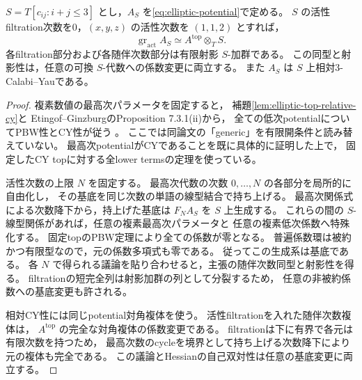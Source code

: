 \begin{lemma}\label{lem:elliptic-universal-lower-pbw}
$S=T[c_{ij}:i+j\le3]$ とし，$A_S$ を\eqref{eq:elliptic-potential}で定める。
$S$ の活性filtration次数を0，$(x,y,z)$ の活性次数を $(1,1,2)$ とすれば，
\[
 \operatorname{gr}_{\mathrm{act}}A_S
       \simeq A^{\mathrm{top}}\otimes_T S.
\]
各filtration部分および各随伴次数部分は有限射影 $S$-加群である。
この同型と射影性は，任意の可換 $S$-代数への係数変更に両立する。
また $A_S$ は $S$ 上相対3-Calabi--Yauである。
\end{lemma}
\begin{proof}
複素数値の最高次パラメータを固定すると，
補題\ref{lem:elliptic-top-relative-cy}と
Etingof--GinzburgのProposition 7.3.1(ii)から，
全ての低次potentialについてPBW性とCY性が従う
\cite{EG2010}。
ここでは同論文の「generic」を有限開条件と読み替えていない。
最高次potentialがCYであることを既に具体的に証明した上で，
固定したCY topに対する全lower termsの定理を使っている。

活性次数の上限 $N$ を固定する。
最高次代数の次数 $0,\ldots,N$ の各部分を局所的に自由化し，
その基底を同じ次数の単語の線型結合で持ち上げる。
最高次関係式による次数降下から，持上げた基底は
$F_NA_S$ を $S$ 上生成する。
これらの間の $S$-線型関係があれば，任意の複素最高次パラメータと
任意の複素低次係数へ特殊化する。
固定topのPBW定理により全ての係数が零となる。
普遍係数環は被約かつ有限型なので，元の係数多項式も零である。
従ってこの生成系は基底である。
各 $N$ で得られる議論を貼り合わせると，主張の随伴次数同型と射影性を得る。
filtrationの短完全列は射影加群の列として分裂するため，
任意の非被約係数への基底変更も許される。

相対CY性には同じpotential対角複体を使う。
活性filtrationを入れた随伴次数複体は，
$A^{\mathrm{top}}$ の完全な対角複体の係数変更である。
filtrationは下に有界で各元は有限次数を持つため，
最高次数のcycleを境界として持ち上げる次数降下により元の複体も完全である。
この議論とHessianの自己双対性は任意の基底変更に両立する。
\end{proof}

